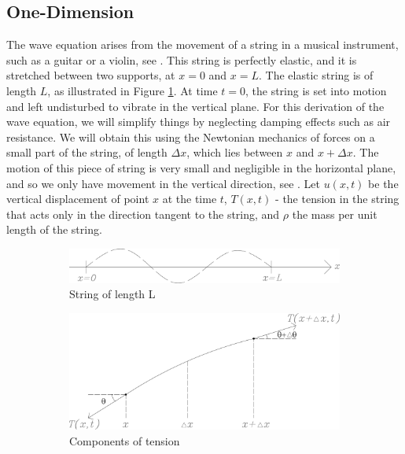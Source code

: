 \documentclass[a4paper, 12pt]{article}
\numberwithin{equation}{section}
\begin{document}
\subsection{One-Dimension}
The wave equation arises from the movement of a string in a musical instrument,
such as a guitar or a violin, see \cite{BoyDiP}. This string is perfectly
elastic, and it is stretched between two supports, at $x=0$ and $x=L$. The
elastic string is of length $L$, as illustrated in Figure \ref{fig:1a}. At time
$t=0$, the string is set into motion and left undisturbed to vibrate in the
vertical plane. For this derivation of the wave equation, we will simplify
things by neglecting damping effects such as air resistance. We will obtain this
using the Newtonian mechanics of forces on a small part of the string, of length
$\Delta x$, which lies between $x$ and $x+\Delta x$. The motion of this piece of
string is very small and negligible in the horizontal plane, and so we only have
movement in the vertical direction, see \cite{Kr}. Let $u(x,t)$ be the vertical
displacement of point $x$ at the time $t$, $T(x,t)$ - the tension in the string
that acts only in the direction tangent to the string, and $\rho$ the mass per
unit length of the string. 

\begin{figure}[h] 
    \begin{subfigure}[t]{0.5\textwidth} 
        \includegraphics[width=0.9\linewidth]{images/grafic-1.png} 
        \caption{String of length L}
        \label{fig:1a}
    \end{subfigure}
    \begin{subfigure}[t]{0.5\textwidth}
        \includegraphics[width=0.9\linewidth]{images/grafic-2.png}
        \caption{Components of tension}
        \label{fig:1b}
    \end{subfigure}     
\caption{}
\label{fig:1}
\end{figure}
\end{document}
